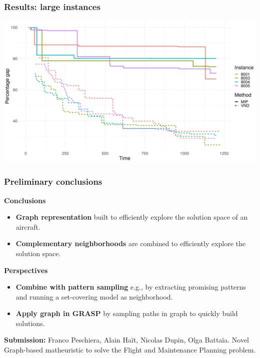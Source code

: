 \begin{frame}
\frametitle{\textbf{Results: large instances}}
  \includegraphics[width=\linewidth]{images/progress_gaps_very_large_255.png}  
\end{frame}

\begin{frame}
\frametitle{\textbf{Preliminary conclusions}}
  \pause
  \begin{block}{\textbf{Conclusions}}
    \begin{itemize}
    \item \textbf{Graph representation} 
      built to efficiently explore the solution space of an aircraft.
    \item \textbf{Complementary neighborhoods} 
      are combined to efficiently explore the solution space.
    \end{itemize}
  \end{block}  
  \pause
  \begin{block}{\textbf{Perspectives}}
    \begin{itemize}
      \item \textbf{Combine with pattern sampling}
        e.g., by extracting promising patterns and running a set-covering model as neighborhood.
      \item \textbf{Apply graph in GRASP}
        by sampling paths in graph to quickly build solutions.
    \end{itemize}
  \end{block}  
  \pause
  \textbf{Submission:} Franco Peschiera, Alain Haït, Nicolas Dupin, Olga Battaïa. Novel Graph-based matheuristic to solve the Flight and Maintenance Planning problem.
\end{frame}

